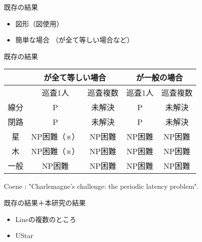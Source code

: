 \begin{frame}{既存の結果}
\begin{itemize}
	\item 図形（図使用）
	\item 簡単な場合 （{\timelimit}が全て等しい場合など）
\end{itemize}
\end{frame}




\begin{frame}{既存の結果}

\begin{table}
	\begin{tabular}{|c|c|c|c|c|}
	\hline       & \multicolumn{2}{|c|}{{\timelimit}が全て等しい場合}
	             & \multicolumn{2}{|c|}{{\timelimit}が一般の場合} \\
	\hline       & 巡査1人      & 巡査複数 & 巡査1人 & 巡査複数 \\
	\hline 線分  & P            & 未解決   & P       & 未解決   \\
	\hline 閉路  & P            & 未解決   & P       & 未解決   \\
	\hline 星    & NP困難（※） & NP困難   & NP困難  & NP困難   \\
	\hline 木    & NP困難（※） & NP困難   & NP困難  & NP困難   \\
	\hline 一般  & NP困難       & NP困難   & NP困難  & NP困難   \\
	\hline
	\end{tabular}
\end{table}

Coene : "Charlemagne's challenge: the periodic latency problem".
\end{frame}




\begin{frame}{既存の結果＋本研究の結果}
\begin{itemize}
	\item Lineの複数のところ
	\item UStar
\end{itemize}
\end{frame}






